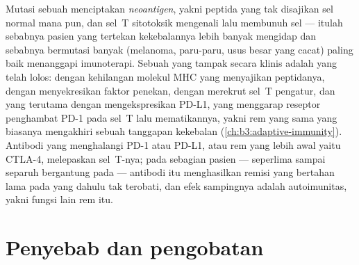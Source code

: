 \begin{proposition}\label{prop:b3:cancer-biology:immune}
Mutasi sebuah  menciptakan \emph{neoantigen}, yakni peptida yang tak
disajikan sel normal mana pun, dan sel~T sitotoksik mengenali lalu membunuh sel
 --- itulah sebabnya pasien yang tertekan kekebalannya lebih banyak
mengidap  dan sebabnya  bermutasi banyak (melanoma, paru-paru, usus
besar yang  cacat) paling baik menanggapi
imunoterapi. Sebuah  yang tampak secara klinis adalah  yang telah
lolos: dengan kehilangan molekul MHC yang menyajikan peptidanya, dengan
menyekresikan faktor penekan, dengan merekrut sel~T pengatur, dan yang
terutama dengan mengekspresikan PD-L1, yang menggarap reseptor penghambat PD-1
pada sel~T lalu mematikannya, yakni rem yang sama yang biasanya mengakhiri
sebuah tanggapan kekebalan (\cref{ch:b3:adaptive-immunity}). Antibodi yang
menghalangi PD-1 atau PD-L1, atau rem yang lebih awal yaitu CTLA-4, melepaskan
sel~T-nya; pada sebagian pasien --- seperlima sampai separuh bergantung pada
 --- antibodi itu menghasilkan remisi yang bertahan lama pada 
yang dahulu tak terobati, dan efek sampingnya adalah autoimunitas, yakni
fungsi lain rem itu.
\end{proposition}

\section{Penyebab dan pengobatan}

